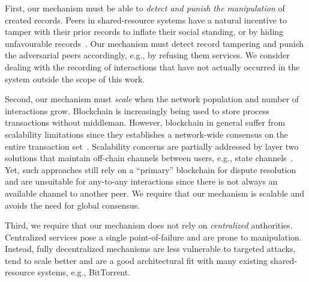 First, our mechanism must be able to \emph{detect and punish the manipulation} of created records.
Peers in shared-resource systems have a natural incentive to tamper with their prior records to inflate their social standing, or by hiding unfavourable records~\cite{meulpolder2009bartercast}.
Our mechanism must detect record tampering and punish the adversarial peers accordingly, e.g., by refusing them services.
We consider dealing with the recording of interactions that have not actually occurred in the system outside the scope of this work.

Second, our mechanism must \emph{scale} when the network population and number of interactions grow.
Blockchain is increasingly being used to store process transactions without middleman.
However, blockchain in general suffer from scalability limitations since they establishes a network-wide consensus on the entire transaction set~\cite{vukolic2015quest}.
Scalability concerns are partially addressed by layer two solutions that maintain off-chain channels between users, e.g., state channels~\cite{mccorry2019pisa}.
Yet, such approaches still rely on a \enquote{primary} blockchain for dispute resolution and are unsuitable for any-to-any interactions since there is not always an available channel to another peer.
We require that our mechanism is scalable and avoids the need for global consensus.

Third, we require that our mechanism does not rely on \emph{centralized} authorities.
Centralized services pose a single point-of-failure and are prone to manipulation.
Instead, fully decentralized mechanisms are less vulnerable to targeted attacks, tend to scale better and are a good architectural fit with many existing shared-resource systems, e.g., BitTorrent.




